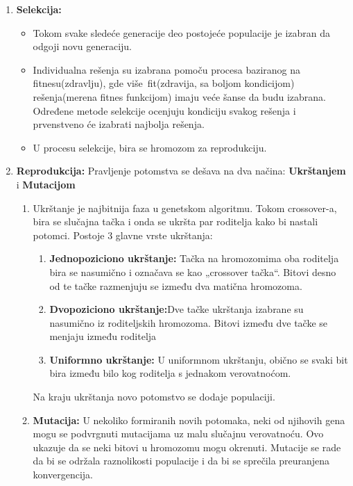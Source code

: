 \documentclass[a4paper]{article}
\begin{document}
\begin{enumerate}
    \item \textbf{Selekcija:}
    \begin{itemize}
	    \item Tokom svake sledeće generacije deo postojeće populacije je izabran da odgoji novu generaciju.
        \item  Individualna rešenja su izabrana pomoču procesa baziranog na fitnesu(zdravlju), gde više fit(zdravija, sa boljom kondicijom) rešenja(merena fitnes funkcijom) imaju veće šanse da budu izabrana. Određene metode selekcije ocenjuju kondiciju svakog rešenja i prvenstveno će izabrati najbolja rešenja.
        \item U procesu selekcije, bira se hromozom za reprodukciju.
    \end{itemize}

    \item \textbf{Reprodukcija:}
    Pravljenje potomstva se dešava na dva načina: \textbf{Ukrštanjem} i \textbf{Mutacijom}
        \begin{enumerate}
             \item Ukrštanje je najbitnija faza u genetskom algoritmu. Tokom crossover-a, bira se slučajna tačka i onda se ukršta par roditelja kako bi nastali potomci. Postoje 3 glavne vrste ukrštanja:
            \begin{enumerate}
                \item \textbf{Jednopoziciono ukrštanje:} Tačka na hromozomima oba roditelja bira se nasumično i označava se kao „crossover tačka“. Bitovi desno od te tačke razmenjuju se između dva matična hromozoma. 
                \item \textbf{Dvopoziciono ukrštanje:}Dve tačke ukrštanja izabrane su nasumično iz roditeljskih hromozoma. Bitovi između dve tačke se menjaju između roditelja
                \item \textbf{Uniformno ukrštanje:} U uniformnom ukrštanju, obično se svaki bit bira između bilo kog roditelja s jednakom verovatnoćom. 
            \end{enumerate}
        Na kraju ukrštanja novo potomstvo se dodaje populaciji.
        
            \item \textbf{Mutacija:}
            U nekoliko formiranih novih potomaka, neki od njihovih gena mogu se podvrgnuti mutacijama uz malu slučajnu verovatnoću. Ovo ukazuje da se neki bitovi u hromozomu mogu okrenuti. Mutacije se rade da bi se održala raznolikosti populacije i da bi se sprečila preuranjena konvergencija. 
        \end{enumerate}
      

\end{enumerate}
\end{document}
